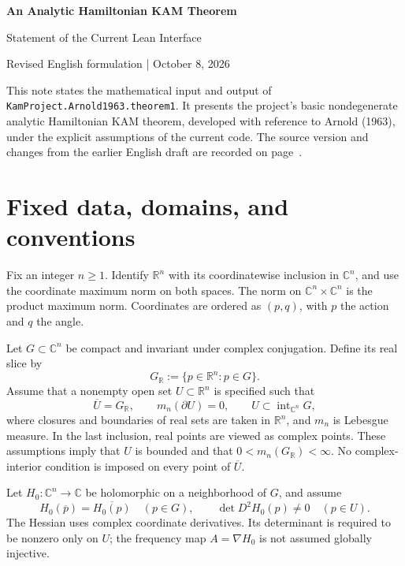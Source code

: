 \documentclass[11pt,a4paper]{article}
\newcommand{\R}{\mathbb R}
\newcommand{\C}{\mathbb C}
\newcommand{\code}[1]{\texttt{\small #1}}
\newcommand{\Gr}{G_{\R}}
\begin{document}
\begin{center}
{\LARGE\bfseries An Analytic Hamiltonian KAM Theorem}\par\vspace{5pt}
{\large Statement of the Current Lean Interface}\par\vspace{6pt}
Revised English formulation \quad | \quad October 8, 2026
\end{center}

This note states the mathematical input and output of
\code{KamProject.Arnold1963.theorem1}. It presents the project's basic
nondegenerate analytic Hamiltonian KAM theorem, developed with reference to
Arnold (1963), under the explicit assumptions of the current code. The source
version and changes from the earlier English draft are recorded on page~\pageref{sec:alignment}.

\section{Fixed data, domains, and conventions}

Fix an integer \(n\ge1\). Identify \(\R^n\) with its coordinatewise inclusion
in \(\C^n\), and use the coordinate maximum norm on both spaces. The norm on
\(\C^n\times\C^n\) is the product maximum norm. Coordinates are ordered as
\((p,q)\), with \(p\) the action and \(q\) the angle.

Let \(G\subset\C^n\) be compact and invariant under complex conjugation.
Define its real slice by
\[
 \Gr:=\{p\in\R^n:p\in G\}.
\]
Assume that a nonempty open set \(U\subset\R^n\) is specified such that
\begin{equation}\label{eq:geometry}
 \overline U=\Gr,\qquad
 m_n(\partial U)=0,\qquad
 U\subset\operatorname{int}_{\C^n}G,
\end{equation}
where closures and boundaries of real sets are taken in \(\R^n\), and
\(m_n\) is Lebesgue measure. In the last inclusion, real points are viewed
as complex points. These assumptions imply that \(U\) is bounded and that
\(0<m_n(\Gr)<\infty\). No complex-interior condition is imposed on every
point of \(\overline U\).

Let \(H_0:\C^n\to\C\) be holomorphic on a neighborhood of \(G\), and assume
\begin{equation}\label{eq:hzero}
 H_0(\overline p)=\overline{H_0(p)}\quad(p\in G),
 \qquad \det D^2H_0(p)\ne0\quad(p\in U).
\end{equation}
The Hessian uses complex coordinate derivatives. Its determinant is required
to be nonzero only on \(U\); the frequency map \(A=\nabla H_0\) is not
assumed globally injective.
\end{document}
